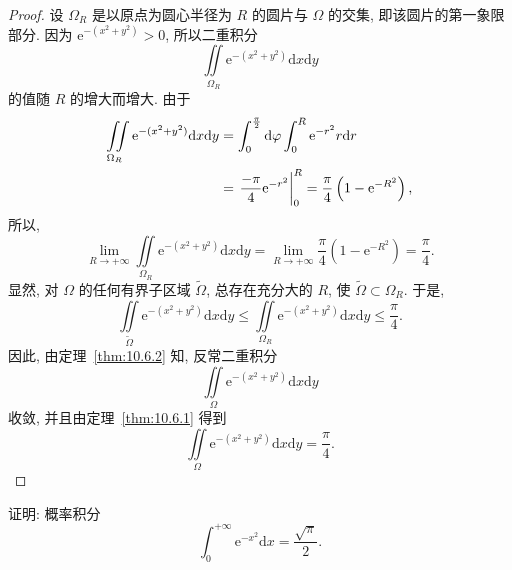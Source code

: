 \begin{proof}
设 $\Omega_{R}$ 是以原点为圆心半径为 $R$ 的圆片与 $\Omega$ 的交集, 即该圆片的第一象限部分.
因为 $\mathrm{e}^{-(x^{2}+y^{2})} > 0$, 所以二重积分
\[
\iint\limits_{\Omega_{R}} \mathrm{e}^{-(x^{2}+y^{2})} \mathrm{d}x\mathrm{d}y
\]
的值随 $R$ 的增大而增大. 由于
\[
\begin{aligned}
\iint\limits_{\Omega_{R}} \mathrm{e}^{-(x^{2}+y^{2})} \mathrm{d}x\mathrm{d}y
&= \int_{0}^{\frac{\pi}{2}} \mathrm{d}\varphi \int_{0}^{R} \mathrm{e}^{-r^{2}} r \mathrm{d}r \notag\\
&= \left. \frac{-\pi}{4} \mathrm{e}^{-r^{2}} \right|_{0}^{R}
 = \frac{\pi}{4}\left( 1 - \mathrm{e}^{-R^{2}} \right), \notag
\end{aligned}
\]
所以,
\[
\lim_{R \to +\infty} \iint\limits_{\Omega_{R}} \mathrm{e}^{-(x^{2}+y^{2})} \mathrm{d}x\mathrm{d}y
= \lim_{R \to +\infty} \frac{\pi}{4}\left( 1 - \mathrm{e}^{-R^{2}} \right)
= \frac{\pi}{4}.
\]
显然, 对 $\Omega$ 的任何有界子区域 $\tilde{\Omega}$, 总存在充分大的 $R$, 使
$\tilde{\Omega} \subset \Omega_{R}$. 于是,
\[
\iint\limits_{\tilde{\Omega}} \mathrm{e}^{-(x^{2}+y^{2})} \mathrm{d}x\mathrm{d}y
\leqslant \iint\limits_{\Omega_{R}} \mathrm{e}^{-(x^{2}+y^{2})} \mathrm{d}x\mathrm{d}y
\leqslant \frac{\pi}{4}.
\]
因此, 由定理~\ref{thm:10.6.2} 知, 反常二重积分
\[
\iint\limits_{\Omega} \mathrm{e}^{-(x^{2}+y^{2})} \mathrm{d}x\mathrm{d}y
\]
收敛, 并且由定理~\ref{thm:10.6.1} 得到
\[
\iint\limits_{\Omega} \mathrm{e}^{-(x^{2}+y^{2})} \mathrm{d}x\mathrm{d}y = \frac{\pi}{4}.
\]
\end{proof}

\begin{example}\label{ex:10.6.2}
证明: 概率积分
\[
\int_{0}^{+\infty} \mathrm{e}^{-x^{2}} \mathrm{d}x = \frac{\sqrt{\pi}}{2}.
\]
\end{example}

